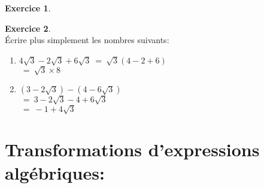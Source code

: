 \documentclass[10pt,a4paper]{article}
\theoremstyle{definition}
\theoremstyle{definition}
\newtheorem{exo}{Exercice}
\begin{document}
\begin{center}
\begin{minipage}[c]{0.4\linewidth}
\begin{exo}
\begin{enumerate}
				\end{enumerate}  
	
		\end{exo}
		\begin{exo}\quad\hfill\textbf{}\\
			Écrire plus simplement les nombres suivants: \\
			
				\begin{enumerate}
				\item $4\sqrt{3}-2\sqrt{3}+6\sqrt{3} \ = \ \sqrt{3}\left(4-2+6\right)$\\$ \ = \ \sqrt{3}\times8 $
				 
				\item $(3-2\sqrt{3})-(4-6\sqrt{3})$\\$ \ = \ 3-2\sqrt{3} - 4+6\sqrt{3}$
				\\$ \ = \ -1+4\sqrt{3}$
				\end{enumerate}			
		\end{exo}
	\end{minipage}
\end{center}

\newpage

\section*{Transformations d'expressions algébriques:}
\quad \\
\end{document}

